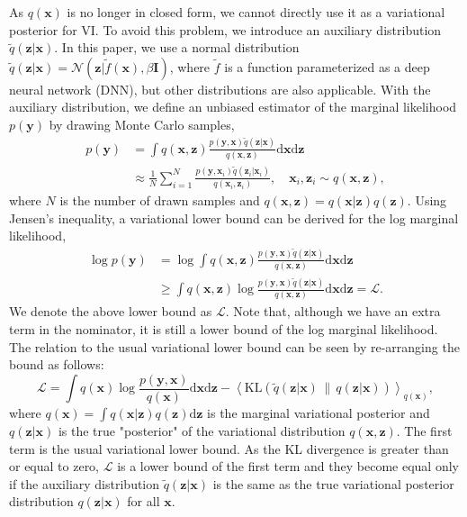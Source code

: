 \documentclass[twoside]{article}
\newcommand{\yV}{\mathbf{y}}
\newcommand{\xV}{\mathbf{x}}
\newcommand{\zV}{\mathbf{z}}
\newcommand{\bound}{\mathcal{L}}
\newcommand{\I}{\mathbf{I}}
\newcommand{\KL}[2]{\text{KL}\left( #1\,\|\,#2 \right)}
\newcommand{\expectationDist}[2]{\left\langle #1 \right\rangle _{#2}}
\newcommand{\diff}{\text{d}}
\newcommand{\gaussianDist}[3]{\mathcal{N}\left(#1|#2,#3\right)}
\begin{document}
As $q(\xV)$ is no longer in closed form, we cannot directly use it as a variational posterior for VI. To avoid this problem, we introduce an auxiliary distribution $\tilde{q}(\zV|\xV)$. In this paper, we use a normal distribution $\tilde{q}(\zV|\xV)= \gaussianDist{\zV}{\tilde{f}(\xV)}{\beta\I}$, where $\tilde{f}$ is a function parameterized as a deep neural network (DNN), but other distributions are also applicable. With the auxiliary distribution, we define an unbiased estimator of the marginal likelihood $p(\yV)$ by drawing Monte Carlo samples,
\begin{equation}
\begin{split}
p(\yV) &= \int q(\xV, \zV) \frac{p(\yV, \xV) \tilde{q}(\zV | \xV)}{q(\xV, \zV)} \diff \xV \diff \zV \\
&\approx \frac{1}{N} \sum_{i=1}^N \frac{p(\yV, \xV_i) \tilde{q}(\zV_i | \xV_i)}{q(\xV_i, \zV_i)}, \quad \xV_i, \zV_i \sim q(\xV, \zV), \label{eqn:importance_sampling}
\end{split}
\end{equation}
where $N$ is the number of drawn samples and $q(\xV, \zV) = q(\xV|\zV) q(\zV)$. Using Jensen's inequality, a variational lower bound can be derived for the log marginal likelihood,
\begin{equation}
\begin{split}
\log p(\yV) &= \log \int q(\xV, \zV) \frac{p(\yV, \xV) \tilde{q}(\zV | \xV)}{q(\xV, \zV)} \diff \xV \diff \zV \\
&\geq  \int q(\xV, \zV) \log \frac{p(\yV, \xV) \tilde{q}(\zV | \xV)}{q(\xV, \zV)} \diff \xV \diff \zV = \bound. \label{eqn:nfw_bound}
\end{split}
\end{equation}
We denote the above lower bound as $\bound$. Note that, although we have an extra term in the nominator, it is still a lower bound of the log marginal likelihood. The relation to the usual variational lower bound can be seen by re-arranging the bound as follows:
\begin{equation}
\bound = \int q(\xV) \log \frac{p(\yV, \xV) }{q(\xV)} \diff \xV \diff \zV - \expectationDist{\KL{\tilde{q}(\zV|\xV)}{q(\zV|\xV)}}{q(\xV)},
\end{equation}
where $q(\xV) = \int q(\xV| \zV) q(\zV) \diff \zV$ is the marginal variational posterior and $q(\zV|\xV)$ is the true "posterior" of the variational distribution $q(\xV, \zV)$. The first term is the usual variational lower bound. As the KL divergence is greater than or equal to zero, $\bound$ is a lower bound of the first term and they become equal only if the auxiliary distribution $\tilde{q}(\zV|\xV)$ is the same as the true variational posterior distribution $q(\zV|\xV)$ for all $\xV$.
\end{document}
